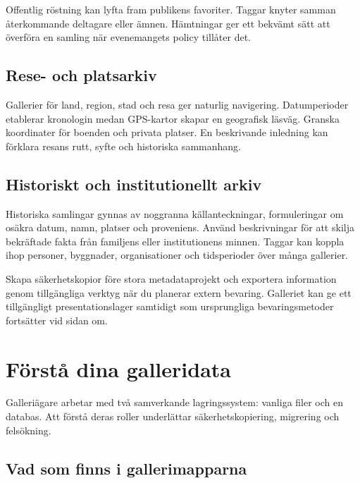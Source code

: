 \documentclass[11pt,a4paper]{article}
\begin{document}
Offentlig röstning kan lyfta fram publikens favoriter. Taggar knyter samman
återkommande deltagare eller ämnen. Hämtningar ger ett bekvämt sätt att överföra
en samling när evenemangets policy tillåter det.

\subsection{Rese- och platsarkiv}

Gallerier för land, region, stad och resa ger naturlig navigering. Datumperioder
etablerar kronologin medan GPS-kartor skapar en geografisk läsväg. Granska
koordinater för boenden och privata platser. En beskrivande inledning kan
förklara resans rutt, syfte och historiska sammanhang.

\subsection{Historiskt och institutionellt arkiv}

Historiska samlingar gynnas av noggranna källanteckningar, formuleringar om
osäkra datum, namn, platser och proveniens. Använd beskrivningar för att skilja
bekräftade fakta från familjens eller institutionens minnen. Taggar kan koppla
ihop personer, byggnader, organisationer och tidsperioder över många gallerier.

Skapa säkerhetskopior före stora metadataprojekt och exportera information genom
tillgängliga verktyg när du planerar extern bevaring. Galleriet kan ge ett
tillgängligt presentationslager samtidigt som ursprungliga bevaringsmetoder
fortsätter vid sidan om.

\section{Förstå dina galleridata}
\label{sec:user-data}

Galleriägare arbetar med två samverkande lagringssystem: vanliga filer och en
databas. Att förstå deras roller underlättar säkerhetskopiering, migrering och
felsökning.

\subsection{Vad som finns i gallerimapparna}
\end{document}
